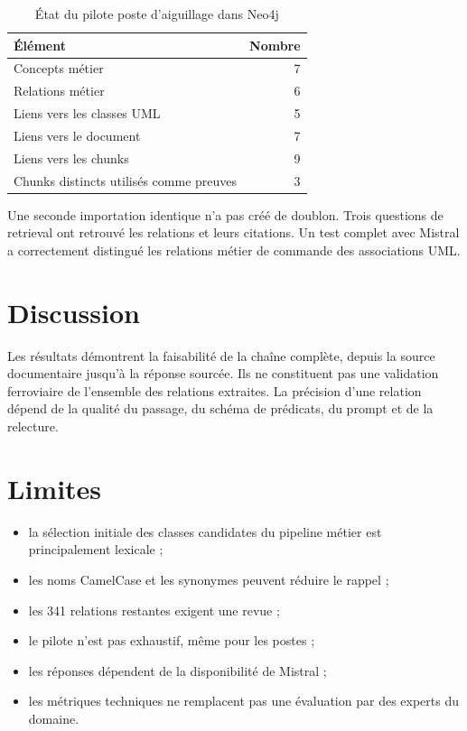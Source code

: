 \begin{table}[H]
\centering
\caption{État du pilote poste d'aiguillage dans Neo4j}
\begin{tabular}{lr}
\toprule
Élément & Nombre \\
\midrule
Concepts métier & 7 \\
Relations métier & 6 \\
Liens vers les classes UML & 5 \\
Liens vers le document & 7 \\
Liens vers les chunks & 9 \\
Chunks distincts utilisés comme preuves & 3 \\
\bottomrule
\end{tabular}
\end{table}

Une seconde importation identique n'a pas créé de doublon. Trois questions de retrieval ont retrouvé les relations et leurs citations. Un test complet avec Mistral a correctement distingué les relations métier de commande des associations UML.

\section{Discussion}

Les résultats démontrent la faisabilité de la chaîne complète, depuis la source documentaire jusqu'à la réponse sourcée. Ils ne constituent pas une validation ferroviaire de l'ensemble des relations extraites. La précision d'une relation dépend de la qualité du passage, du schéma de prédicats, du prompt et de la relecture.

\section{Limites}

\begin{itemize}
  \item la sélection initiale des classes candidates du pipeline métier est principalement lexicale ;
  \item les noms CamelCase et les synonymes peuvent réduire le rappel ;
  \item les 341 relations restantes exigent une revue ;
  \item le pilote n'est pas exhaustif, même pour les postes ;
  \item les réponses dépendent de la disponibilité de Mistral ;
  \item les métriques techniques ne remplacent pas une évaluation par des experts du domaine.
\end{itemize}

